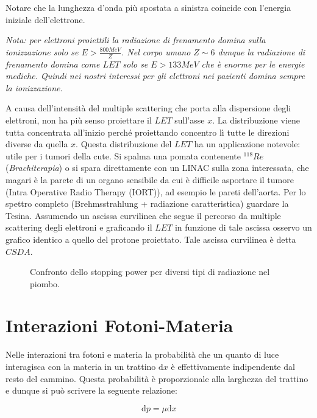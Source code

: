 Notare che la lunghezza d'onda più spostata a sinistra coincide con l'energia iniziale dell'elettrone.

\emph{Nota: per elettroni proiettili la radiazione di frenamento domina sulla ionizzazione solo se $E>\frac{800 MeV}{Z}$. Nel corpo umano $Z\sim6$ dunque la radiazione di frenamento domina come $LET$ solo se $E>133 MeV$ che è enorme per le energie mediche. Quindi nei nostri interessi per gli elettroni nei pazienti domina sempre la ionizzazione.}

A causa dell'intensità del multiple scattering che porta alla dispersione degli elettroni, non ha più senso proiettare il $LET$ sull'asse $x$. La distribuzione viene tutta concentrata all'inizio perché proiettando concentro lì tutte le direzioni diverse da quella $x$.
Questa distribuzione del $LET$ ha un applicazione notevole: utile per i tumori della cute. Si spalma una pomata contenente $^{118}Re$ (\emph{Brachiterapia}\cite{Brachioterapia}) o si spara direttamente con un LINAC sulla zona interessata, che magari è la parete di un organo sensibile da cui è difficile asportare il tumore (Intra Operative Radio Therapy (IORT)\cite{Intraoperative_probes}), ad esempio le pareti dell'aorta.
Per lo spettro completo (Brehmsstrahlung + radiazione caratteristica) guardare la Tesina.
Assumendo un ascissa curvilinea che segue il percorso da multiple scattering degli elettroni e graficando il $LET$ in funzione di tale ascissa osservo un grafico identico a quello del protone proiettato. Tale ascissa curvilinea è detta $CSDA$.

\begin{figure}
\centering
		\caption{Confronto dello stopping power per diversi tipi di radiazione nel piombo.}
         \label{stoppingpower}
\end{figure}


\section{Interazioni Fotoni-Materia}


Nelle interazioni tra fotoni e materia la probabilità che un quanto di luce interagisca con la materia in un trattino $\mathrm{d}x$ è effettivamente indipendente dal resto del cammino. Questa probabilità è proporzionale alla larghezza del trattino e dunque si può scrivere la seguente relazione:

\begin{equation}
\mathrm{d}p=\mu \mathrm{d}x
\end{equation}

